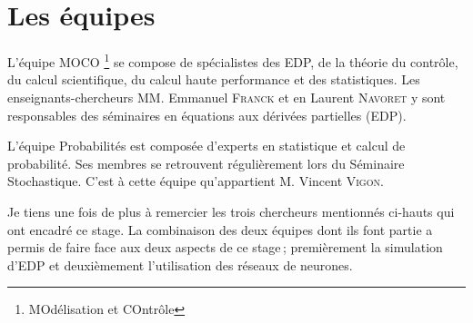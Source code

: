 \section{Les équipes}

L'équipe MOCO \footnote{MOdélisation et COntrôle} se compose de spécialistes des EDP, de la théorie du contrôle, du calcul scientifique, du calcul haute performance et des statistiques. Les enseignants-chercheurs MM. Emmanuel \textsc{Franck} et en Laurent \textsc{Navoret} y sont responsables des séminaires en équations aux dérivées partielles (EDP). 

L'équipe Probabilités est composée d'experts en statistique et calcul de probabilité. Ses membres se retrouvent régulièrement lors du Séminaire Stochastique. C'est à cette équipe qu'appartient M. Vincent \textsc{Vigon}. 

Je tiens une fois de plus à remercier les trois chercheurs mentionnés ci-hauts qui ont encadré ce stage. La combinaison des deux équipes dont ils font partie a permis de faire face aux deux aspects de ce stage ; premièrement la simulation d'EDP et deuxièmement l'utilisation des réseaux de neurones.

